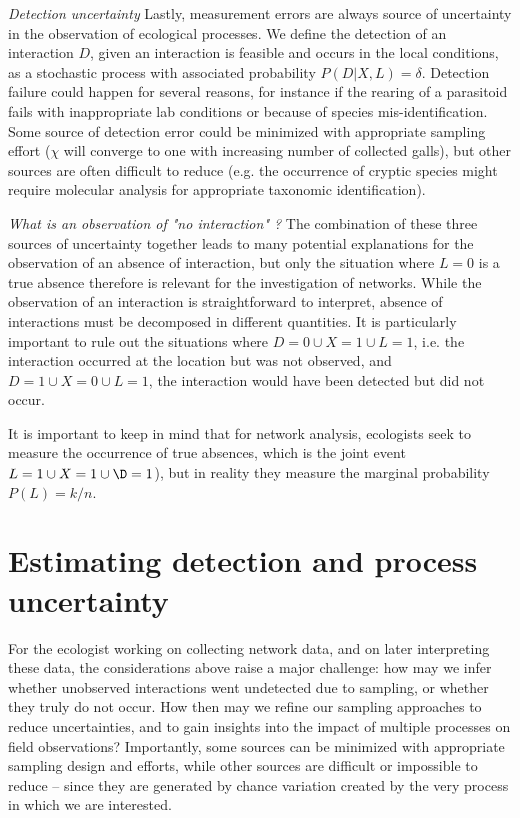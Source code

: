 \documentclass[12pt]{article}
\begin{document}
\textit{Detection uncertainty} Lastly, measurement errors are always source of uncertainty in the observation of ecological processes. We define the detection of an interaction $D$, given an interaction is feasible and occurs in the local conditions, as a stochastic process with associated probability $P(D|X,L)=\delta$. Detection failure could happen for several reasons, for instance if the rearing of a parasitoid fails with inappropriate lab conditions or because of species mis-identification. Some source of detection error could be minimized with appropriate sampling effort ($\chi$ will converge to one with increasing number of collected galls), but other sources are often difficult to reduce (e.g. the occurrence of cryptic species might require molecular analysis for appropriate taxonomic identification).

\textit{What is an observation of "no interaction" ?} The combination of these three sources of uncertainty together leads to many potential explanations for the observation of an absence of interaction, but only the situation where $L = 0$ is a true absence therefore is relevant for the investigation of networks. While the observation of an interaction is straightforward to interpret, absence of interactions must be decomposed in different quantities. It is particularly important to rule out the situations where $D=0 \cup X = 1 \cup L=1$, i.e. the interaction occurred at the location but was not observed, and $D=1 \cup X = 0 \cup L =1$, the interaction would have been detected but did not occur. 

It is important to keep in mind that for network analysis, ecologists seek to measure the occurrence of true absences, which is the joint event $L=1\cup X=1 \cup \D=1$), but in reality they measure the marginal probability $P(L) = k/n$. 



\section*{Estimating detection and process uncertainty}

For the ecologist working on collecting network data, and on later interpreting these data, the considerations above raise a major challenge: how may we infer whether unobserved interactions went undetected due to sampling, or whether they truly do not occur. How then may we refine our sampling approaches to reduce uncertainties, and to gain insights into the impact of multiple processes on field observations? Importantly, some sources can be minimized with appropriate sampling design and efforts, while other sources are difficult or impossible to reduce – since they are generated by chance variation created by the very process in which we are interested.
\end{document}
